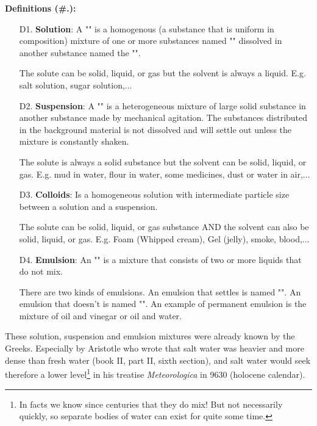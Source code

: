 	\textbf{Definitions (\#\thesection.\mydef):}
	\begin{enumerate}
		\item[D1.] \textbf{Solution}: A "" is a homogenous (a substance that is uniform in composition) mixture of one or more substances named "" dissolved in another substance named the "".
	
		The solute can be solid, liquid, or gas but the solvent is always a liquid. E.g. salt solution, sugar solution,...
	
		\item[D2.] \textbf{Suspension}: A "" is a heterogeneous mixture of large solid substance in another substance made by mechanical agitation. The substances distributed in the background material is not dissolved and will settle out unless the mixture is constantly shaken.
	
		The solute is always a solid substance but the solvent can be solid, liquid, or gas. E.g. mud in water, flour in water, some medicines, dust or water in air,...
	
		\item[D3.] \textbf{Colloids}: Is a homogeneous solution with intermediate particle size between a solution and a suspension.
		
		The solute can be solid, liquid, or gas substance AND the solvent can also be solid, liquid, or gas. E.g. Foam (Whipped cream), Gel (jelly), smoke, blood,...
	
		\item[D4.] \textbf{Emulsion}: An "" is a mixture that consists of two or more liquids that do not mix. 
		
		There are two kinds of emulsions. An emulsion that settles is named "". An emulsion that doesn't is named "". An example of permanent emulsion is the mixture of oil and vinegar or oil and water.
	\end{enumerate}
	These solution, suspension and emulsion mixtures were already known by the Greeks. Especially by Aristotle who wrote that salt water was heavier and more dense than fresh water (book II, part II, sixth section), and salt water would seek therefore a lower level\footnote{In facts we know since centuries that they do mix! But not necessarily quickly, so separate bodies of water can exist for quite some time.} in his treatise \textit{Meteorologica} in 9630 (holocene calendar).
